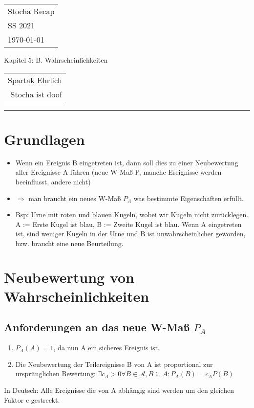 \documentclass[a4paper,11pt]{scrartcl}
\begin{document}
{\raggedright
\begin{tabular}{l}
    Stocha Recap \\
    SS 2021 \\
    \today{}
\end{tabular}}
\hfill
{\Large Kapitel 5: B. Wahrscheinlichkeiten}
\hfill
\begin{tabular}{r}
    Spartak Ehrlich \\
    Stocha ist doof
\end{tabular}
\hrule

\section{Grundlagen }
\begin{itemize}
    \item Wenn ein Ereignis B eingetreten ist, dann soll dies zu einer Neubewertung aller Ereignisse A führen (neue W-Maß P, manche Ereignisse werden beeinflusst, andere nicht)
    \item $\Rightarrow$ man braucht ein neues W-Maß $P_A$ was bestimmte Eigenschaften erfüllt.
    \item Bsp: Urne mit roten und blauen Kugeln, wobei wir Kugeln nicht zurücklegen.
    A := Erste Kugel ist blau, B := Zweite Kugel ist blau.
    Wenn A eingetreten ist, sind weniger Kugeln in der Urne und B ist unwahrscheinlicher geworden, bzw. braucht eine neue Beurteilung.
\end{itemize}

\section{Neubewertung von Wahrscheinlichkeiten}

\subsection{Anforderungen an das neue W-Maß $P_A$}

\begin{enumerate}
    \item $P_A(A) = 1$, da nun A ein sicheres Ereignis ist.
    \item Die Neubewertung der Teilereignisse B von A ist proportional zur ursprünglichen Bewertung: $\exists c_A > 0 \forall B \in \mathcal{A}, B \subseteq A: P_A(B) = c_A P(B)$
\end{enumerate}
In Deutsch: Alle Ereignisse die von A abhängig sind werden um den gleichen Faktor c gestreckt. \\
\end{document}
